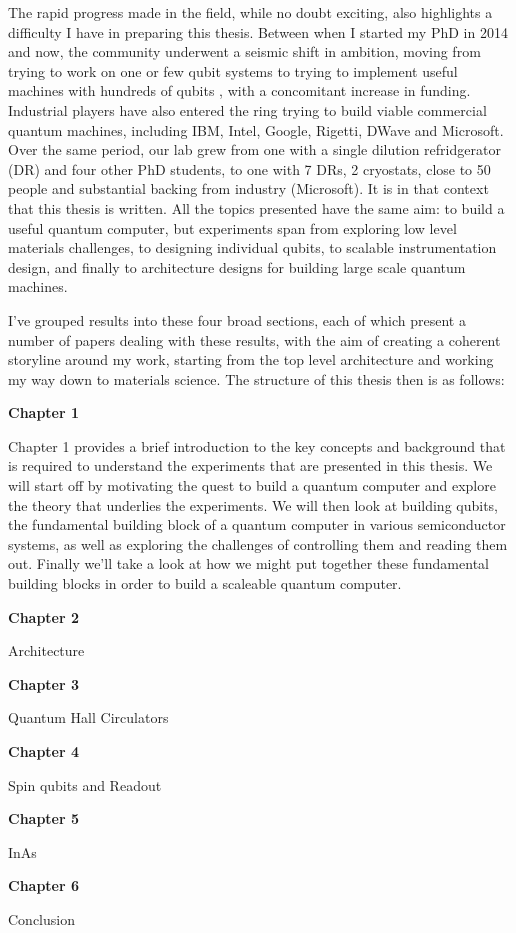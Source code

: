 The rapid progress made in the field, while no doubt exciting, also highlights a difficulty I have in
preparing this thesis. Between when I started my PhD in 2014 and now, the community underwent a seismic
shift in ambition, moving from trying to work on one or few qubit systems \cite{iarpa_mqco} to trying
to implement useful machines with hundreds of qubits \cite{Monroe440}, with a concomitant increase in
funding. Industrial players have also
entered the ring trying to build viable commercial quantum machines, including IBM, Intel, Google, Rigetti,
DWave and Microsoft. Over the same period, our lab grew from one with a single dilution refridgerator (DR)
and four other PhD students, to one with 7 DRs, 2 cryostats, close to 50 people and substantial backing
from industry (Microsoft). It is in that context that this thesis is written. All the topics presented have the
same aim: to build a useful quantum computer, but experiments span from exploring low level materials challenges,
to designing individual qubits, to scalable instrumentation design, and finally to architecture
designs for building large scale quantum machines.

I've grouped results into these four broad sections, each of which present a number of papers dealing
with these results, with the aim of creating a coherent storyline around my work, starting from the top
level architecture and working my way down to materials science. The structure of this
thesis then is as follows:

\medskip
\noindent\textbf{Chapter 1}

\noindent
Chapter 1 provides a brief introduction to the key concepts and background that is required to understand
the experiments that are presented in this thesis. We will start off by motivating the quest to build a quantum
computer and explore the theory that underlies the experiments. We will then look at building qubits,
the fundamental building block of a quantum computer in various semiconductor systems, as well as exploring
the challenges of controlling them and reading them out. Finally we'll take a look at how we might put
together these fundamental building blocks in order to build a scaleable quantum computer.

\medskip
\noindent\textbf{Chapter 2}

\noindent
Architecture

\medskip
\noindent\textbf{Chapter 3}

\noindent
Quantum Hall Circulators

\medskip
\noindent\textbf{Chapter 4}

\noindent
Spin qubits and Readout

\medskip
\noindent\textbf{Chapter 5}

\noindent
InAs

\medskip
\noindent\textbf{Chapter 6}

\noindent
Conclusion

